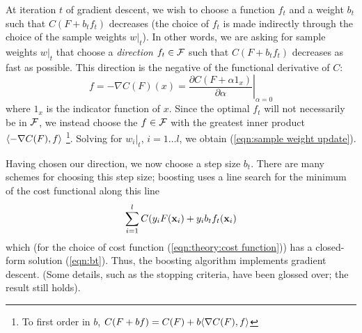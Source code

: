 At iteration $t$ of gradient descent, we wish to choose a function $f_t$ and
a weight $b_t$ such that $C(F + b_t f_t)$ decreases (the choice of
$f_t$ is made indirectly through the choice of the sample weights
$w|_t$).  In other words, we are asking for sample weights $w|_t$ that
choose a \emph{direction} $f_t \in \mathcal{F}$ such that $C(F + b_t f_t)$
decreases as fast as possible.  This direction is the negative of the
functional derivative of $C$:
%
\begin{equation}
f = -\nabla C(F)(x) = \left. \frac{\partial C(F + \alpha
1_x)}{\partial \alpha} \right|_{\alpha = 0}
\end{equation}
%
where $1_x$ is the indicator function of $x$.  Since the
optimal $f_t$ will not necessarily be in $\mathcal{F}$, we instead choose the
$f \in \mathcal{F}$ with the greatest inner product $\langle {-\nabla
C(F)} , {f} \rangle$ \footnote{To first order in $b$, $C(F+bf) = C(F) +
b \langle {\nabla C(F)} , {f} \rangle$}.  Solving for $w_i|_t$, $i=1 \ldots l$, we
obtain (\ref{eqn:sample weight update}).

Having chosen our direction, we now choose a step size $b_t$.
There are many schemes for choosing this step size; boosting uses a
line search for the minimum of the cost functional along this line
%
\begin{equation}
\sum_{i=1}^{l} C(y_i F(\mathbf{x}_i) + y_i b_t f_t(\mathbf{x}_i)
\end{equation}
%
which (for the choice of cost function (\ref{eqn:theory:cost
function})) has a closed-form solution (\ref{eqn:bt}).  Thus, the
boosting algorithm implements gradient descent.  (Some details, such
as the stopping criteria, have been glossed over; the result still
holds).

